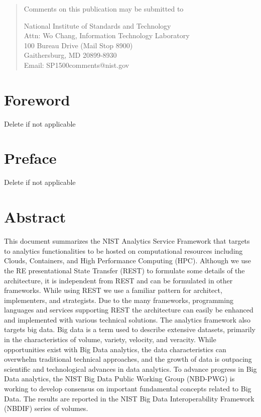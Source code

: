 \documentclass[12pt]{article}
\begin{document}
\begin{titlepage}
\bigskip
\bigskip
\bigskip

\begin{quote}
Comments on this publication may be submitted to 

National Institute of Standards and Technology \\
Attn: Wo Chang, Information Technology Laboratory\\
100 Bureau Drive (Mail Stop 8900)\\ Gaithersburg, MD 20899-8930\\
Email: SP1500comments@nist.gov
\end{quote}

\vfill

\end{titlepage}
\section*{Foreword}
\normalsize Delete if not applicable\\
\section*{Preface}
\normalsize Delete if not applicable\\

\section*{Abstract}

\normalsize This document summarizes the NIST Analytics Service Framework that targets to analytics functionalities to be hosted on computational resources including Clouds, Containers, and High Performance Computing (HPC). Although we use the RE presentational State Transfer (REST) to formulate some details of the architecture, it is independent from REST and can be formulated in other frameworks. While using REST we use a familiar pattern for architect, implementers, and strategists. Due to the many frameworks, programming languages and services supporting REST the architecture can easily be enhanced and implemented with various technical solutions. 
The analytics framework also targets big data. Big data is a term used to describe extensive datasets, primarily in the characteristics of volume, variety, velocity, and veracity. While opportunities exist with Big Data analytics, the data characteristics can overwhelm traditional technical approaches, and the growth of data is outpacing scientific and technological advances in data analytics. To advance progress in Big Data analytics, the NIST Big Data Public Working Group (NBD-PWG) is working to develop consensus on important fundamental concepts related to Big Data. The results are reported in the NIST Big Data Interoperability Framework (NBDIF) series of volumes.\\
\end{document}
